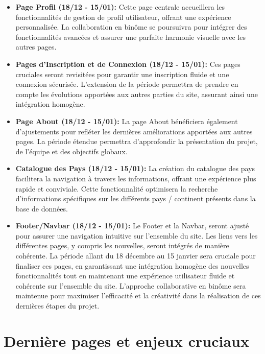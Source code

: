 \documentclass[mstat,12pt]{unswthesis}
\begin{document}
\begin{adjustwidth}{-2cm}{}
\begin{itemize}
\tightlist
\item
  \textbf{Page Profil (18/12 - 15/01):} Cette page centrale accueillera
  les fonctionnalités de gestion de profil utilisateur, offrant une
  expérience personnalisée. La collaboration en binôme se poursuivra
  pour intégrer des fonctionnalités avancées et assurer une parfaite
  harmonie visuelle avec les autres pages.
\item
  \textbf{Pages d'Inscription et de Connexion (18/12 - 15/01):} Ces
  pages cruciales seront revisitées pour garantir une inscription fluide
  et une connexion sécurisée. L'extension de la période permettra de
  prendre en compte les évolutions apportées aux autres parties du site,
  assurant ainsi une intégration homogène.
\item
  \textbf{Page About (18/12 - 15/01):} La page About bénéficiera
  également d'ajustements pour refléter les dernières améliorations
  apportées aux autres pages. La période étendue permettra d'approfondir
  la présentation du projet, de l'équipe et des objectifs globaux.
\item
  \textbf{Catalogue des Pays (18/12 - 15/01):} La création du catalogue
  des pays facilitera la navigation à travers les informations, offrant
  une expérience plus rapide et conviviale. Cette fonctionnalité
  optimisera la recherche d'informations spécifiques sur les différents
  pays / continent présents dans la base de données.
\item
  \textbf{Footer/Navbar (18/12 - 15/01):} Le Footer et la Navbar, seront
  ajusté pour assurer une navigation intuitive sur l'ensemble du site.
  Les liens vers les différentes pages, y compris les nouvelles, seront
  intégrés de manière cohérente. La période allant du 18 décembre au 15
  janvier sera cruciale pour finaliser ces pages, en garantissant une
  intégration homogène des nouvelles fonctionnalités tout en maintenant
  une expérience utilisateur fluide et cohérente sur l'ensemble du site.
  L'approche collaborative en binôme sera maintenue pour maximiser
  l'efficacité et la créativité dans la réalisation de ces dernières
  étapes du projet.
\end{itemize}

\hypertarget{derniuxe8re-pages-et-enjeux-cruciaux}{%
\section{Dernière pages et enjeux
cruciaux}\label{derniuxe8re-pages-et-enjeux-cruciaux}}


\end{adjustwidth}
\end{document}
